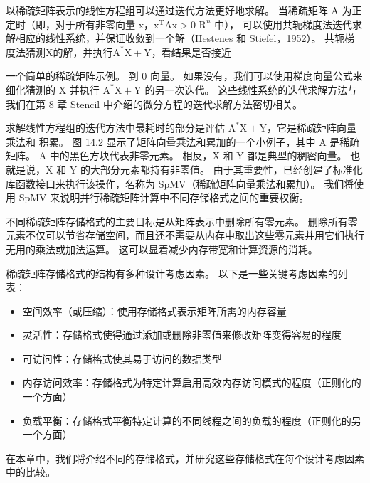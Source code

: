 以稀疏矩阵表示的线性方程组可以通过迭代方法更好地求解。 
当稀疏矩阵 $\mathrm{A}$ 为正定时（即，对于所有非零向量 
$\mathrm{x}$，$\mathrm{x}^{\mathrm{T}} \mathrm{Ax}>0$ $\mathrm{R}^{n}$ 中），
可以使用共轭梯度法迭代求解相应的线性系统，并保证收敛到一个解（Hestenes 和 Stiefel，1952）。 
共轭梯度法猜测$\mathrm{X}$的解，并执行$\mathrm{A}^{*} \mathrm{X}+\mathrm{Y}$，看结果是否接近

一个简单的稀疏矩阵示例。 到 0 向量。 
如果没有，我们可以使用梯度向量公式来细化猜测的 $\mathrm{X}$ 并执行 
$\mathrm{A}^{*} \mathrm{X}+\mathrm{Y}$ 的另一次迭代。 
这些线性系统的迭代求解方法与我们在第 8 章 Stencil 中介绍的微分方程的迭代求解方法密切相关。

求解线性方程组的迭代方法中最耗时的部分是评估 $\mathrm{A}^{*} \mathrm{X}+\mathrm{Y}$，它是稀疏矩阵向量乘法和 积累。 
图 14.2 显示了矩阵向量乘法和累加的一个小例子，其中 A 是稀疏矩阵。 
$\mathrm{A}$ 中的黑色方块代表非零元素。 相反，$\mathrm{X}$ 和 $\mathrm{Y}$ 都是典型的稠密向量。 
也就是说，$\mathrm{X}$ 和 $\mathrm{Y}$ 的大部分元素都持有非零值。 
由于其重要性，已经创建了标准化库函数接口来执行该操作，名称为 SpMV（稀疏矩阵向量乘法和累加）。 
我们将使用 SpMV 来说明并行稀疏矩阵计算中不同存储格式之间的重要权衡。

不同稀疏矩阵存储格式的主要目标是从矩阵表示中删除所有零元素。 
删除所有零元素不仅可以节省存储空间，而且还不需要从内存中取出这些零元素并用它们执行无用的乘法或加法运算。 
这可以显着减少内存带宽和计算资源的消耗。

稀疏矩阵存储格式的结构有多种设计考虑因素。 以下是一些关键考虑因素的列表：

\begin{itemize}
   \item 空间效率（或压缩）：使用存储格式表示矩阵所需的内存容量

   \item 灵活性：存储格式使得通过添加或删除非零值来修改矩阵变得容易的程度

   \item 可访问性：存储格式使其易于访问的数据类型

   \item 内存访问效率：存储格式为特定计算启用高效内存访问模式的程度（正则化的一个方面）

   \item 负载平衡：存储格式平衡特定计算的不同线程之间的负载的程度（正则化的另一个方面）

\end{itemize}

在本章中，我们将介绍不同的存储格式，并研究这些存储格式在每个设计考虑因素中的比较。

